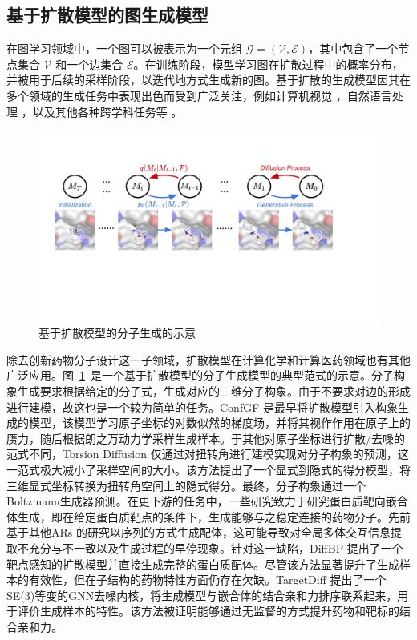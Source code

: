 \subsection{基于扩散模型的图生成模型}
在图学习领域中，一个图可以被表示为一个元组 $\mathcal{G} = (\mathcal{V}, \mathcal{E})$，其中包含了一个节点集合 $\mathcal{V}$ 和一个边集合 $\mathcal{E}$。在训练阶段，模型学习图在扩散过程中的概率分布，并被用于后续的采样阶段，以迭代地方式生成新的图。基于扩散的生成模型因其在多个领域的生成任务中表现出色而受到广泛关注，例如计算机视觉 \cite{blendeddiffusion_avrahami_22,cascadeddiff_ho_22,gradforshapegen_cai_20,sgmpointcloud_luo_21}，自然语言处理 \cite{struccddpm_austin_21,argmaxflow_hoogeboom_21,stepunrolled_savinov_22}，以及其他各种跨学科任务等 \cite{cdvae_xie_22,housediffusion_shabani_23,nap_lei_23}。

\begin{figure}[h]
  \centering
  \includegraphics[width=\linewidth]{figures/targetdiff.pdf}
  \caption{基于扩散模型的分子生成的示意 \cite{targetdiff_guan_23}}
  \label{fig:targetdiff}
\end{figure}

除去创新药物分子设计这一子领域，扩散模型在计算化学和计算医药领域也有其他广泛应用。图~\ref{fig:targetdiff}~是一个基于扩散模型的分子生成模型的典型范式的示意。分子构象生成要求根据给定的分子式，生成对应的三维分子构象。由于不要求对边的形成进行建模，故这也是一个较为简单的任务。ConfGF \cite{confgf_shi_21}是最早将扩散模型引入构象生成的模型，该模型学习原子坐标的对数似然的梯度场，并将其视作作用在原子上的赝力，随后根据朗之万动力学采样生成样本。于其他对原子坐标进行扩散/去噪的范式不同，Torsion Diffusion \cite{tordiff_jing_22}仅通过对扭转角进行建模实现对分子构象的预测，这一范式极大减小了采样空间的大小。该方法提出了一个显式到隐式的得分模型，将三维显式坐标转换为扭转角空间上的隐式得分。最终，分子构象通过一个Boltzmann生成器预测。在更下游的任务中，一些研究致力于研究蛋白质靶向嵌合体生成，即在给定蛋白质靶点的条件下，生成能够与之稳定连接的药物分子。先前基于其他ARs \cite{graphbp_liu_22, arligand_luo_21, pocket2mol_peng_22}的研究以序列的方式生成配体，这可能导致对全局多体交互信息提取不充分与不一致以及生成过程的早停现象。针对这一缺陷，DiffBP \cite{diffbp_lin_22} 提出了一个靶点感知的扩散模型并直接生成完整的蛋白质配体。尽管该方法显著提升了生成样本的有效性，但在子结构的药物特性方面仍存在欠缺。TargetDiff \cite{targetdiff_guan_23}提出了一个SE(3)等变的GNN去噪内核，将生成模型与嵌合体的结合亲和力排序联系起来，用于评价生成样本的特性。该方法被证明能够通过无监督的方式提升药物和靶标的结合亲和力。

